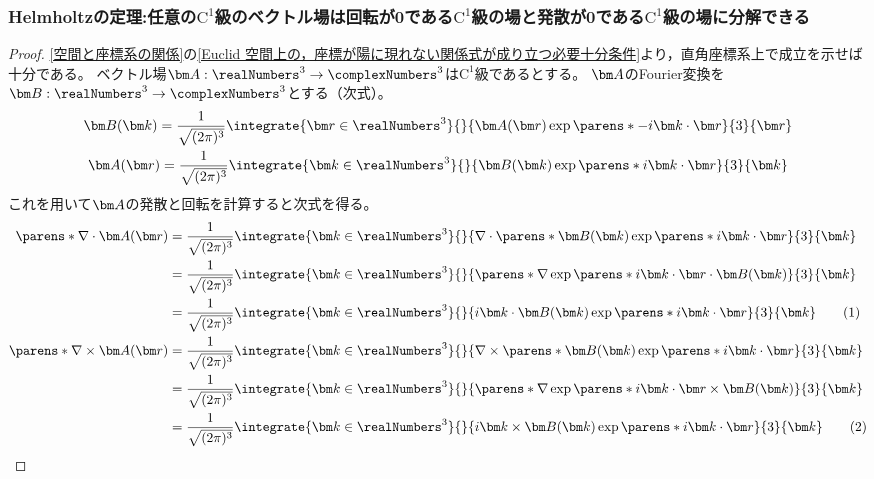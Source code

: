             \subsubsection{Helmholtzの定理:任意の\texorpdfstring{$\mathrm{C}^1$}{C\string^1}級のベクトル場は回転が\texorpdfstring{$\bm{0}$}{0}である\texorpdfstring{$\mathrm{C}^1$}{C\string^1}級の場と発散が0である\texorpdfstring{$\mathrm{C}^1$}{C\string^1}級の場に分解できる}
            \newcommand*{\vBO}{\vB_\mathrm{O}(\vk)}
            \newcommand*{\vBP}{\vB_\mathrm{P}(\vk)}
            \begin{proof}
                \ref{空間と座標系の関係}の\ref{Euclid 空間上の，座標が陽に現れない関係式が成り立つ必要十分条件}より，直角座標系上で成立を示せば十分である。
                ベクトル場$\vA:\realNumbers^3\to\complexNumbers^3$は$\mathrm{C}^1$級であるとする。
                $\vA$のFourier変換を$\vB:\realNumbers^3\to\complexNumbers^3$とする（次式）。
                \begin{gather*}
                    \vB(\vk) = \frac{1}{\sqrt{(2\pi)^3}}\integrate{\vr\in\realNumbers^3}{}{\vA(\vr)\exp\parens*{-i\vk\cdot\vr}}{3}{\vr} \\
                    \vA(\vr) = \frac{1}{\sqrt{(2\pi)^3}}\integrate{\vk\in\realNumbers^3}{}{\vB(\vk)\exp\parens*{i\vk\cdot\vr}}{3}{\vk}
                \end{gather*}
                これを用いて$\vA$の発散と回転を計算すると次式を得る。
                \begin{align*}
                    \parens*{\nabla\cdot\vA}(\vr) &= \frac{1}{\sqrt{(2\pi)^3}}\integrate{\vk\in\realNumbers^3}{}{\nabla\cdot\parens*{\vB(\vk)\exp\parens*{i\vk\cdot\vr}}}{3}{\vk} \\
                    &= \frac{1}{\sqrt{(2\pi)^3}}\integrate{\vk\in\realNumbers^3}{}{\parens*{\nabla\exp\parens*{i\vk\cdot\vr}}\cdot\vB(\vk)}{3}{\vk} \\
                    &= \frac{1}{\sqrt{(2\pi)^3}}\integrate{\vk\in\realNumbers^3}{}{i\vk\cdot\vB(\vk)\exp\parens*{i\vk\cdot\vr}}{3}{\vk} \tag{1} \\
                    \parens*{\nabla\times\vA}(\vr) &= \frac{1}{\sqrt{(2\pi)^3}}\integrate{\vk\in\realNumbers^3}{}{\nabla\times\parens*{\vB(\vk)\exp\parens*{i\vk\cdot\vr}}}{3}{\vk} \\
                    &= \frac{1}{\sqrt{(2\pi)^3}}\integrate{\vk\in\realNumbers^3}{}{\parens*{\nabla\exp\parens*{i\vk\cdot\vr}}\times\vB(\vk)}{3}{\vk} \\
                    &= \frac{1}{\sqrt{(2\pi)^3}}\integrate{\vk\in\realNumbers^3}{}{i\vk\times\vB(\vk)\exp\parens*{i\vk\cdot\vr}}{3}{\vk} \tag{2}

\end{align*}
\end{proof}
